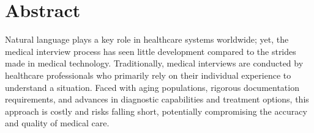 

%
%


\chapter[abstract]{Abstract}



Natural language plays a key role in healthcare systems worldwide; yet, the medical interview process has seen little development compared to the strides made in medical technology. 
Traditionally, medical interviews are conducted by healthcare professionals who primarily rely on their individual experience to understand a situation. 
Faced with aging populations, rigorous documentation requirements, and advances in diagnostic capabilities and treatment options, this approach is costly and risks falling short, potentially compromising the accuracy and quality of medical care.

